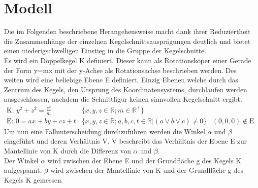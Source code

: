 \setcounter{section}{0}
\section{Modell}
Die im Folgenden beschriebene Herangehensweise macht dank ihrer Reduziertheit die Zusammenhänge der einzelnen Kegelschnittsausprägungen deutlich und bietet einen niederigschwelligen Einstieg in die Gruppe der Kegelschnitte.\\
Es wird ein Doppelkegel K definiert. Dieser kann als Rotationsköper einer Gerade der Form y=mx mit der y-Achse als Rotationsachse beschrieben werden. Des weiten wird eine beliebige Ebene E definiert. Einzig Ebenen welche durch das Zentrum des Kegels, den Ursprung des Koordinatensystems, durchlaufen werden ausgeschlossen, nachdem die Schnittfigur keinen sinnvollen Kegelschnitt ergibt.
\begin{displaymath}
	\begin{array}{lrl}
		\text{K: }y^2+z^2=\frac{z^2}{m} & \{x,y,z\in \mathbb{R};m\in \mathbb{R}^{\!+\!}\}\\
		\text{E: }0=ax+by+cz+t & \{x,y,z\in \mathbb{R}; a,b,c,t\in \mathbb{R}|(a  \lor b \lor c) \neq 0\} & (0,0,0) \notin \text{E}
	\end{array}
\end{displaymath}
Um nun eine Fallunterscheidung durchzuführen werden die Winkel \(\alpha\) und \(\beta\) eingeführt und deren Verhältnis V. V beschreibt das Verhältnis der Ebene E zur Mantellinie von K durch die Differenz von \(\alpha\) und \(\beta\).\\
Der Winkel \(\alpha\) wird zwischen der Ebene E und der Grundfläche g des Kegels K aufgespannt. \(\beta\) wird zwischen der Mantellinie von K und der Grundfläche g des Kegels K gemessen.\\

